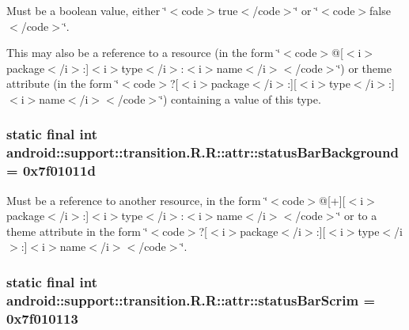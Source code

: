 Must be a boolean value, either \char`\"{}$<$code$>$true$<$/code$>$\char`\"{} or \char`\"{}$<$code$>$false$<$/code$>$\char`\"{}. 

This may also be a reference to a resource (in the form \char`\"{}$<$code$>$@\mbox{[}$<$i$>$package$<$/i$>$:\mbox{]}$<$i$>$type$<$/i$>$:$<$i$>$name$<$/i$>$$<$/code$>$\char`\"{}) or theme attribute (in the form \char`\"{}$<$code$>$?\mbox{[}$<$i$>$package$<$/i$>$:\mbox{]}\mbox{[}$<$i$>$type$<$/i$>$:\mbox{]}$<$i$>$name$<$/i$>$$<$/code$>$\char`\"{}) containing a value of this type. \hypertarget{classandroid_1_1support_1_1transition_1_1_r_1_1attr_964ffa54cdae224de4abd6e1e111ef43}{
\subsubsection[{statusBarBackground}]{\setlength{\rightskip}{0pt plus 5cm}static final int android::support::transition.R.R::attr::statusBarBackground = 0x7f01011d}}
\label{classandroid_1_1support_1_1transition_1_1_r_1_1attr_964ffa54cdae224de4abd6e1e111ef43}


Must be a reference to another resource, in the form \char`\"{}$<$code$>$@\mbox{[}+\mbox{]}\mbox{[}$<$i$>$package$<$/i$>$:\mbox{]}$<$i$>$type$<$/i$>$:$<$i$>$name$<$/i$>$$<$/code$>$\char`\"{} or to a theme attribute in the form \char`\"{}$<$code$>$?\mbox{[}$<$i$>$package$<$/i$>$:\mbox{]}\mbox{[}$<$i$>$type$<$/i$>$:\mbox{]}$<$i$>$name$<$/i$>$$<$/code$>$\char`\"{}. \hypertarget{classandroid_1_1support_1_1transition_1_1_r_1_1attr_9619e83e8b912dd7aa78cd54c3c018b9}{
\subsubsection[{statusBarScrim}]{\setlength{\rightskip}{0pt plus 5cm}static final int android::support::transition.R.R::attr::statusBarScrim = 0x7f010113}}
\label{classandroid_1_1support_1_1transition_1_1_r_1_1attr_9619e83e8b912dd7aa78cd54c3c018b9}


